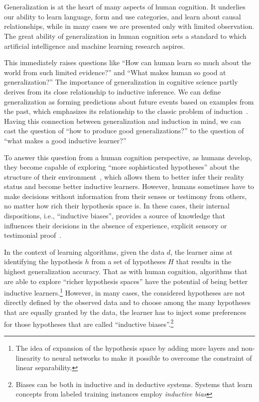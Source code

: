 \part{}
\label{part3}
Generalization is at the heart of many aspects of human cognition. It underlies our ability to learn language, form and use categories, and learn about causal relationships, while in many cases we are presented only with limited observation. The great ability of generalization in human cognition sets a standard to which artificial intelligence and machine learning research aspires.

This immediately raises questions like ``How can human learn so much about the world from such limited evidence?'' and ``What makes human so good at generalization?''
The importance of generalization in cognitive science partly derives
from its close relationship to inductive inference.  We can define generalization as forming predictions about future events based on examples from the past, which emphasizes its relationship to the classic problem of induction~\citep{hume2003treatise}. 
Having this connection between generalization and induction in mind, we can cast the question of ``how to produce good generalizations?'' to the question of ``what makes a good inductive learner?''

To answer this question from a human cognition perspective, as humans develop, they become capable of exploring ``more sophisticated hypotheses'' about the structure of their environment~\citep{inhelder1958growth}, which allows them to better infer their reality status and become better inductive learners. However, humans sometimes have to make decisions without information from their senses or testimony from others, no matter how rich their hypothesis space is.
In these cases, their internal dispositions, i.e., ``inductive biases'', provides a source of knowledge that influences their decisions in the absence of experience, explicit sensory or testimonial proof~\cite{sodian1987children,griffiths2010probabilistic}.

In the context of learning algorithms, given the data $d$, the learner aims at identifying the hypothesis $h$ from a set of hypotheses $H$ that results in the highest generalization accuracy.  That as with human cognition, algorithms that are able to explore ``richer hypothesis spaces'' have the potential of being better inductive learners.\footnote{The idea of expansion of the hypothesis space by adding more layers and non-linearity to neural networks to make it possible to overcome the constraint of linear separability.} However, in many cases, the considered hypotheses are not directly defined by the observed data and to choose among the many hypotheses that are equally granted by the data, the learner has to inject some preferences for those hypotheses that are called ``inductive biases''.\footnote{Biases can be both in inductive and in deductive systems. Systems that learn concepts from labeled training instances employ \emph{inductive bias}}

